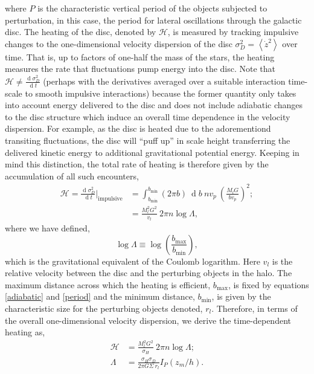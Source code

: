 \documentclass[usenatbib]{mnras}
\renewcommand{\d}[1]{\! \mathrm{d}#1 \:}
\newcommand{\deriv}[2]{\frac{\d{#1}}{\d{#2}}}
\renewcommand{\d}[1]{\ensuremath{\operatorname{d}\!{#1}}}
\begin{document}
where $P$ is the characteristic vertical period of the objects subjected to perturbation, in this case, the period for lateral oscillations through the galactic disc. The heating of the disc, denoted by $\mathcal{H}$, is measured by tracking impulsive changes to the one-dimensional velocity dispersion of the disc $\sigma_D^2 = \left< \dot{z}^2 \right>$ over time. That is, up to factors of one-half the mass of the stars, the heating measures the rate that fluctuations pump energy into the disc. Note that $\mathcal{H} \neq \deriv{\sigma_D^2}{t}$ (perhaps with the derivatives averaged over a suitable interaction time-scale to smooth impulsive interactions) because the former quantity only takes into account energy delivered to the disc and does not include adiabatic changes to the disc structure which induce an overall time dependence in the velocity dispersion. For example, as the disc is heated due to the adorementiond transiting fluctuations, the disc will ``puff up'' in scale height transferring the delivered kinetic energy to additional gravitational potential energy. Keeping in mind this distinction, the total rate of heating is therefore given by the accumulation of all such encounters,
\begin{subequations}
\begin{align}
\mathcal{H} = \deriv{\sigma_D^2}{t} \bigg|_{\text{impulsive}} &= \int_{b_{\min}}^{b_{\min}} (2 \pi b) \: \d{b} \: n v_p \: \left( \frac{M_l G}{b v_p} \right)^2 ;
\\
& = \frac{M_l^2 G^2}{v_l} \: 2 \pi n \log{\Lambda},
\end{align}
\end{subequations}
where we have defined,
\begin{equation}
\log{\Lambda} \equiv \log{\left( \frac{b_{\text{max}}}{b_{\text{min}}} \right)},
\end{equation}
which is the gravitational equivalent of the Coulomb logarithm. Here $v_l$ is the relative velocity between the disc and the perturbing objects in the halo. 
The maximum distance across which the heating is efficient, $b_{\max}$, is fixed by equations \eqref{adiabatic} and \eqref{period} and the minimum distance, $b_{\min}$, is given by the characteristic size for the perturbing objects denoted, $r_{l}$. 
Therefore, in terms of the overall one-dimensional velocity dispersion, we derive the time-dependent heating as,
\begin{subequations}
\begin{align}
\mathcal{H} &= \frac{M_l^2 G^2}{\sigma_H} \: 2 \pi n \log{\Lambda} ;
\\
\Lambda & = \frac{\sigma_H \sigma_D}{2 \pi G \Sigma \: r_l} I_P(z_m / h).
\end{align}
\end{subequations}
\end{document}
